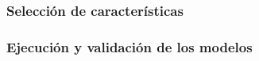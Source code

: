 
\subsubsection{Selección de características}

\subsubsection{Ejecución y validación de los modelos}





















